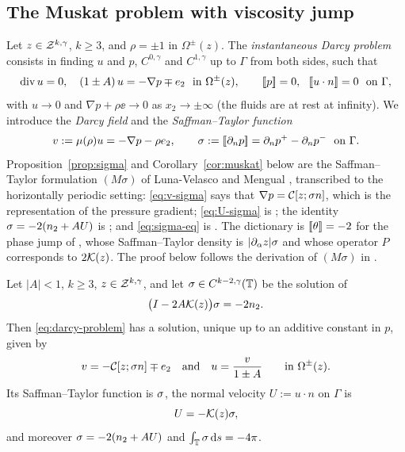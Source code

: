 \subsection{The Muskat problem with viscosity jump}
Let $z\in\mathcal{Z}^{k,\gamma}$, $k\ge3$, and $\rho=\pm1$ in $\Omega^\pm(z)$. The \emph{instantaneous Darcy problem} consists in finding $u$ and $p$, $C^{0,\gamma}$ and $C^{1,\gamma}$ up to $\Gamma$ from
both sides, such that
\begin{equation}\label{eq:darcy-problem}
\operatorname{div} u=0,\quad (1\pm A)\,u=-\nabla p\mp e_2\ \text{ in }\Omega^\pm(z),\qquad [\![p]\!]=0,\ \ [\![u\cdot n]\!]=0\ \text{ on }\Gamma,
\end{equation}
with $u\to0$ and $\nabla p+\rho\ee\to0$ as $x_2\to\pm\infty$ (the fluids are at rest at infinity). We introduce the \emph{Darcy field} and the \emph{Saffman--Taylor function}
\[
v:=\mu(\rho)u=-\nabla p-\rho e_2,\qquad \sigma:=[\![\partial_n p]\!]=\partial_np^+-\partial_np^-\ \text{ on }\Gamma .
\]
Proposition~\ref{prop:sigma} and Corollary~\ref{cor:muskat} below are the Saffman--Taylor formulation $(M\sigma)$ of Luna-Velasco and Mengual \cite[Sec.~3.1]{LM26}, transcribed to the
horizontally periodic setting: \eqref{eq:v-sigma} says that $\nabla p=\mathcal{C}[z;\sigma n]$, which is the representation \cite[(3.2)]{LM26} of the pressure gradient; \eqref{eq:U-sigma} is
\cite[(3.6)]{LM26}; the identity $\sigma=-2(n_2+AU)$ is \cite[(3.7a) and (3.8)]{LM26}; and \eqref{eq:sigma-eq} is \cite[(5.12)]{LM26}. The dictionary is $[\![\theta]\!]=-2$ for the phase jump
of \cite{LM26}, whose Saffman--Taylor density is $|\partial_\alpha z|\sigma$ and whose operator $P$ corresponds to $2\mathcal{K}(z)$. The proof below follows the derivation of $(M\sigma)$ in
\cite[Sec.~3.1.5]{LM26}.

\begin{proposition}\label{prop:sigma}
Let $|A|<1$, $k\ge3$, $z\in\mathcal{Z}^{k,\gamma}$, and let $\sigma\in C^{k-2,\gamma}(\mathbb{T})$ be the solution of
\begin{equation}\label{eq:sigma-eq}
\big(I-2A\mathcal{K}(z)\big)\sigma=-2n_2 .
\end{equation}
Then \eqref{eq:darcy-problem} has a solution, unique up to an additive constant in $p$, given by
\begin{equation}\label{eq:v-sigma}
v=-\mathcal{C}[z;\sigma n]\mp e_2\quad\text{and}\quad u=\frac{v}{1\pm A}\qquad\text{in }\Omega^\pm(z).
\end{equation}
Its Saffman--Taylor function is $\sigma$, the normal velocity $U:=u\cdot n$ on $\Gamma$ is
\begin{equation}\label{eq:U-sigma}
U=-\mathcal{K}(z)\sigma,
\end{equation}
and moreover $\sigma=-2(n_2+AU)$ and $\int_{\mathbb{T}}\sigma\,\mathrm{d} s=-4\pi$.
\end{proposition}

